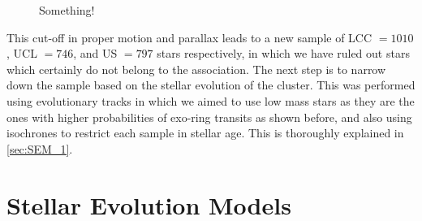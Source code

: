 \begin{figure}[!ht]
\centering
\caption{\scriptsize{Something!}}
\label{fig:Projection_ScoCen}
\end{figure}

This cut-off in proper motion and parallax leads to a new sample of LCC $= 1010$, UCL $= 746$, and US $= 797$ stars respectively, in which we have ruled out stars which certainly do not belong to the association. The next step is to narrow down the sample based on the stellar evolution of the cluster. This was performed using evolutionary tracks in which we aimed to use low mass stars as they are the ones with higher probabilities of exo-ring transits as shown before, and also using isochrones to restrict each sample in stellar age. This is thoroughly explained in \autoref{sec:SEM_1}.   



\section{Stellar Evolution Models}\label{sec:SEM_1}


